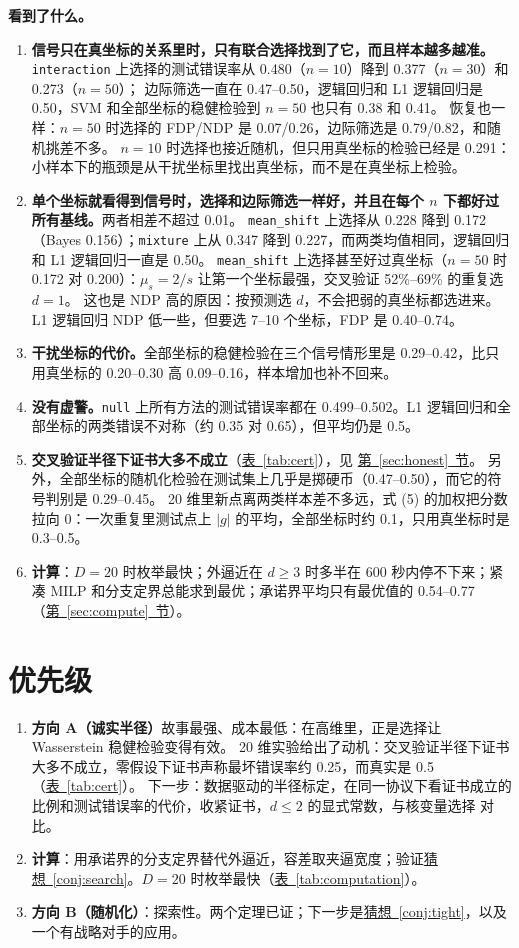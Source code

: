 \documentclass[11pt,a4paper,fontset=none]{ctexart}
\newcommand{\Secref}[1]{\hyperref[#1]{第~\ref*{#1}~节}}
\newcommand{\Tabref}[1]{\hyperref[#1]{表~\ref*{#1}}}
\newcommand{\Nref}[2]{\hyperref[#2]{#1~\ref*{#2}}}
\theoremstyle{definition}
\newcommand{\para}[1]{\par\smallskip\noindent\textbf{#1}\ }
\begin{document}
\para{看到了什么。}
\begin{enumerate}
\item \textbf{信号只在真坐标的关系里时，只有联合选择找到了它，而且样本越多越准。}\texttt{interaction} 上选择的测试错误率从 0.480（$n=10$）降到 0.377（$n=30$）和 0.273（$n=50$）；
边际筛选一直在 0.47--0.50，逻辑回归和 L1 逻辑回归是 0.50，SVM 和全部坐标的稳健检验到 $n=50$ 也只有 0.38 和 0.41。
恢复也一样：$n=50$ 时选择的 FDP/NDP 是 0.07/0.26，边际筛选是 0.79/0.82，和随机挑差不多。
$n=10$ 时选择也接近随机，但只用真坐标的检验已经是 0.291：小样本下的瓶颈是从干扰坐标里找出真坐标，而不是在真坐标上检验。
\item \textbf{单个坐标就看得到信号时，选择和边际筛选一样好，并且在每个 $n$ 下都好过所有基线。}两者相差不超过 0.01。
\texttt{mean\_shift} 上选择从 0.228 降到 0.172（Bayes 0.156）；\texttt{mixture} 上从 0.347 降到 0.227，而两类均值相同，逻辑回归和 L1 逻辑回归一直是 0.50。
\texttt{mean\_shift} 上选择甚至好过真坐标（$n=50$ 时 0.172 对 0.200）：$\mu_s=2/s$ 让第一个坐标最强，交叉验证 52\%--69\% 的重复选 $d=1$。
这也是 NDP 高的原因：按预测选 $d$，不会把弱的真坐标都选进来。L1 逻辑回归 NDP 低一些，但要选 7--10 个坐标，FDP 是 0.40--0.74。
\item \textbf{干扰坐标的代价。}全部坐标的稳健检验在三个信号情形里是 0.29--0.42，比只用真坐标的 0.20--0.30 高 0.09--0.16，样本增加也补不回来。
\item \textbf{没有虚警。}\texttt{null} 上所有方法的测试错误率都在 0.499--0.502。L1 逻辑回归和全部坐标的两类错误不对称（约 0.35 对 0.65），但平均仍是 0.5。
\item \textbf{交叉验证半径下证书大多不成立}（\Tabref{tab:cert}），见 \Secref{sec:honest}。
另外，全部坐标的随机化检验在测试集上几乎是掷硬币（0.47--0.50），而它的符号判别是 0.29--0.45。
20 维里新点离两类样本差不多远，式 (5) 的加权把分数拉向 0：一次重复里测试点上 $|g|$ 的平均，全部坐标时约 0.1，只用真坐标时是 0.3--0.5。
\item \textbf{计算}：$D=20$ 时枚举最快；外逼近在 $d\ge3$ 时多半在 600 秒内停不下来；紧凑 MILP 和分支定界总能求到最优；承诺界平均只有最优值的 0.54--0.77（\Secref{sec:compute}）。
\end{enumerate}

\section{优先级}\label{sec:plan}
\begin{enumerate}
\item \textbf{方向 A（诚实半径）}故事最强、成本最低：在高维里，正是选择让 Wasserstein 稳健检验变得有效。
20 维实验给出了动机：交叉验证半径下证书大多不成立，零假设下证书声称最坏错误率约 0.25，而真实是 0.5（\Tabref{tab:cert}）。
下一步：数据驱动的半径标定，在同一协议下看证书成立的比例和测试错误率的代价，收紧证书，$d\le2$ 的显式常数，与核变量选择 \cite{wang2023variable} 对比。
\item \textbf{计算}：用承诺界的分支定界替代外逼近，容差取夹逼宽度；验证\Nref{猜想}{conj:search}。$D=20$ 时枚举最快（\Tabref{tab:computation}）。
\item \textbf{方向 B（随机化）}：探索性。两个定理已证；下一步是\Nref{猜想}{conj:tight}，以及一个有战略对手的应用。
\end{enumerate}
\end{document}
